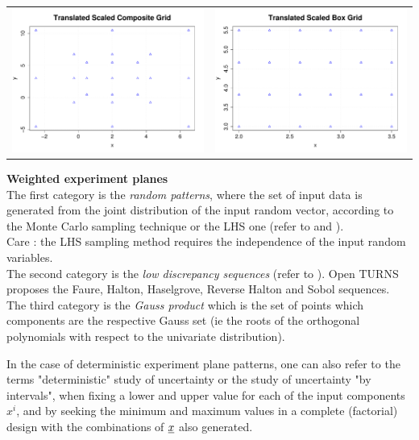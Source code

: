 {  \begin{center}
    \begin{tabular}{cc}
      \includegraphics[width=8cm]{TranslatedScaledCompositeGrid.pdf} &   \includegraphics[width=8cm]{TranslatedScaledBoxGrid.pdf}
    \end{tabular}
  \end{center}

  \vspace*{2mm}
  {\bf Weighted experiment planes}\\

  The first category is the {\itshape random patterns}, where the set of input data is generated from the joint distribution of the input random vector, according to the Monte Carlo sampling technique or the LHS one (refer to  and ).\\
  Care : the LHS sampling method requires the independence of the input random variables.\\


  The second category is the {\itshape low discrepancy sequences} (refer to ). Open TURNS proposes the Faure, Halton, Haselgrove, Reverse Halton and Sobol sequences.\\


  The third category is the {\itshape Gauss product} which is the set of points which  components are the respective Gauss set (ie the roots of the orthogonal polynomials with respect to the univariate distribution).



}
{
  In the case of deterministic experiment plane patterns, one can also refer to the terms "deterministic" study of uncertainty or the study of uncertainty "by intervals", when fixing a lower and upper value for each of the input components $x^i$, and by seeking the minimum and maximum values in a complete (factorial) design with the combinations of ${\underline{x}}$ also generated.
}

